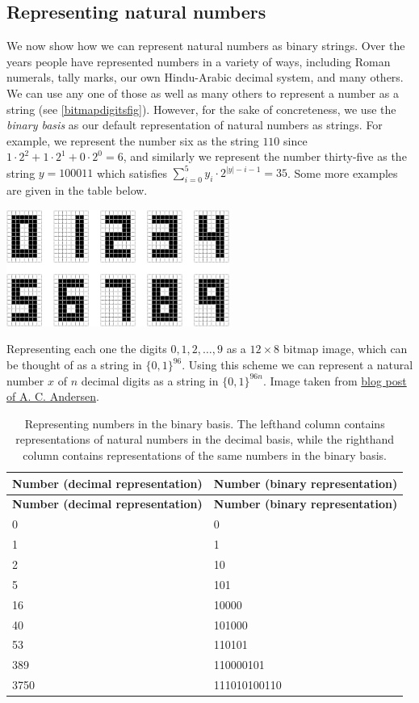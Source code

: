 \subsection{Representing natural
numbers}\label{Representing-natural-numb}

We now show how we can represent natural numbers as binary strings. Over
the years people have represented numbers in a variety of ways,
including Roman numerals, tally marks, our own Hindu-Arabic decimal
system, and many others. We can use any one of those as well as many
others to represent a number as a string (see \cref{bitmapdigitsfig}).
However, for the sake of concreteness, we use the \emph{binary basis} as
our default representation of natural numbers as strings. For example,
we represent the number six as the string \(110\) since
\(1\cdot 2^{2} + 1 \cdot 2^1 + 0 \cdot 2^0 = 6\), and similarly we
represent the number thirty-five as the string \(y = 100011\) which
satisfies \(\sum_{i=0}^5 y_i \cdot 2^{|y|-i-1} = 35\). Some more
examples are given in the table below.


\begin{marginfigure}
\centering
\includegraphics[width=\linewidth, height=1.5in, keepaspectratio]{../figure/digitsbitmap.png}
\caption{Representing each one the digits \(0,1,2,\ldots,9\) as a
\(12\times 8\) bitmap image, which can be thought of as a string in
\(\{0,1\}^{96}\). Using this scheme we can represent a natural number
\(x\) of \(n\) decimal digits as a string in \(\{0,1\}^{96n}\). Image
taken from
\href{http://blog.andersen.im/2010/12/autonomous-neural-development-and-pruning/}{blog
post of A. C. Andersen}.}
\label{bitmapdigitsfig}
\end{marginfigure}

\begin{longtable}[]{@{}ll@{}}
\caption{Representing numbers in the binary basis. The lefthand column
contains representations of natural numbers in the decimal basis, while
the righthand column contains representations of the same numbers in the
binary basis.}\tabularnewline
\toprule
\textbf{Number (decimal representation)} & \textbf{Number (binary
representation)}\tabularnewline
\midrule
\endfirsthead
\toprule
\textbf{Number (decimal representation)} & \textbf{Number (binary
representation)}\tabularnewline
\midrule
\endhead
0 & 0\tabularnewline
1 & 1\tabularnewline
2 & 10\tabularnewline
5 & 101\tabularnewline
16 & 10000\tabularnewline
40 & 101000\tabularnewline
53 & 110101\tabularnewline
389 & 110000101\tabularnewline
3750 & 111010100110\tabularnewline
\bottomrule
\end{longtable}

